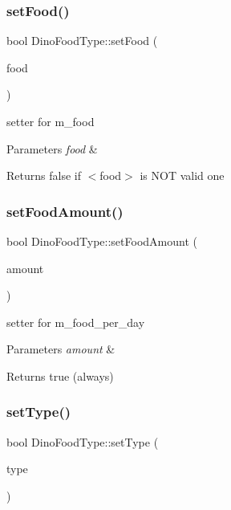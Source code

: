 \subsubsection{\texorpdfstring{set\+Food()}{setFood()}}
{\footnotesize\ttfamily bool Dino\+Food\+Type\+::set\+Food (\begin{DoxyParamCaption}\item[{\hyperlink{classString}{String} const \&}]{food }\end{DoxyParamCaption})}

setter for m\+\_\+food 
\begin{DoxyParams}{Parameters}
{\em food} & \\
\hline
\end{DoxyParams}
\begin{DoxyReturn}{Returns}
false if $<$food$>$ is N\+OT valid one 
\end{DoxyReturn}
\mbox{\label{classDinoFoodType_aff41b0cd6c54bf4510d1bf7441bc5bfd}} 
\subsubsection{\texorpdfstring{set\+Food\+Amount()}{setFoodAmount()}}
{\footnotesize\ttfamily bool Dino\+Food\+Type\+::set\+Food\+Amount (\begin{DoxyParamCaption}\item[{\hyperlink{DinoFoodType_8hpp_a81be3c5791355e37ef9afec946f6ff50}{Food\+Amount} const \&}]{amount }\end{DoxyParamCaption})}

setter for m\+\_\+food\+\_\+per\+\_\+day 
\begin{DoxyParams}{Parameters}
{\em amount} & \\
\hline
\end{DoxyParams}
\begin{DoxyReturn}{Returns}
true (always) 
\end{DoxyReturn}
\mbox{\label{classDinoFoodType_ae770be06031c3f7e3b0d25a9508320eb}} 
\subsubsection{\texorpdfstring{set\+Type()}{setType()}}
{\footnotesize\ttfamily bool Dino\+Food\+Type\+::set\+Type (\begin{DoxyParamCaption}\item[{\hyperlink{classString}{String} const \&}]{type }\end{DoxyParamCaption})}


